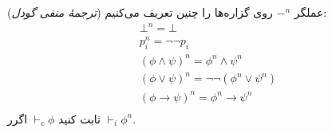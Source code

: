 (\emph{ترجمهٔ منفی گودل})
عملگر $\mathord{-}^n$ روی گزاره‌ها را چنین تعریف می‌کنیم:
\begin{gather*}
    \bot^n=\bot\\
    p_i^n=\neg\neg p_i\\
    (\phi\wedge\psi)^n=\phi^n\wedge\psi^n\\
    (\phi\vee\psi)^n=\neg\neg(\phi^n\vee\psi^n)\\
    (\phi\to\psi)^n=\phi^n\to\psi^n\\
\end{gather*}
ثابت کنید $\vdash_c\phi$ اگرر $\vdash_i\phi^n$.